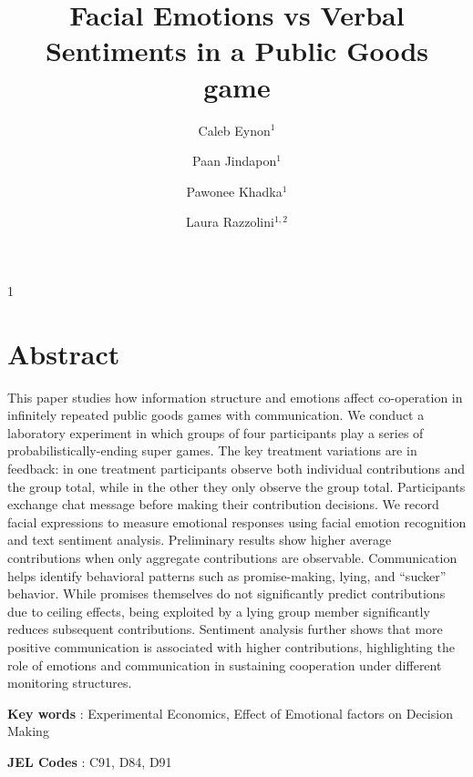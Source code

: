 \documentclass[12pt,letterpaper,english]{article}
\title{Facial Emotions vs Verbal Sentiments in a Public Goods game}
\author{
    Caleb Eynon$^{1}$ \and
  Paan Jindapon$^{1}$ \and
  Pawonee Khadka$^{1}$ \and
    Laura Razzolini$^{1,2}$
}
\date{}
\begin{document}
\begin{spacing}{1}
\maketitle


\section*{Abstract}
This paper studies how information structure and emotions affect co-operation in infinitely repeated public goods games with communication. We conduct a laboratory experiment in which groups of four participants play a series of probabilistically-ending super games. The key treatment variations are in feedback: in one treatment participants observe both individual contributions and the group total, while in the other they only observe the group total. Participants exchange chat message before making their contribution decisions. We record facial expressions to measure emotional responses using facial emotion recognition and text sentiment analysis. Preliminary results show higher average contributions when only aggregate contributions are observable. Communication helps identify behavioral patterns such as promise-making, lying, and “sucker” behavior. While promises themselves do not significantly predict contributions due to ceiling effects, being exploited by a lying group member significantly reduces subsequent contributions. Sentiment analysis further shows that more positive communication is associated with higher contributions, highlighting the role of emotions and communication in sustaining cooperation under different monitoring structures.


\vspace{1em}
\noindent\textbf{Key words} : Experimental Economics, Effect of Emotional factors on Decision Making 

\noindent\textbf{JEL Codes} : C91, D84, D91 
\end{spacing}
\newpage
\end{document}
